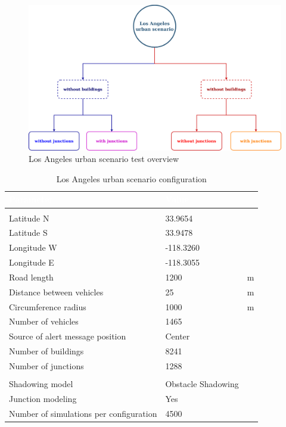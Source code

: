 		\begin{figure}[H]
			\centering
			\includegraphics[width=1.0\textwidth]{immagini/la-25/overview}
			\caption{Los Angeles urban scenario test overview}
			\label{fig:la-overview}
		\end{figure}
	
		\begin{table}[H]
			\def\arraystretch{1.1}
			\begin{tabularx}{\textwidth}{l | l  l}
				\rowcolor{I} {\large \textcolor{white}{Parameter}} & {\large \textcolor{white}{Value}} & {\large \textcolor{white}{}} \TBstrut  \\
				\toprule
				\endhead
				\rowcolor{P} \multicolumn{3}{c}{Scenario configuration} \\
				\midrule[1pt]
				Latitude N								& 33.9654				& \textdegree		\\
				Latitude S								& 33.9478				& \textdegree		\\
				Longitude W								& -118.3260				& \textdegree		\\
				Longitude E								& -118.3055				& \textdegree		\\
				Road length 							& 1200	 				& m		\\
				Distance between vehicles 				& 25					& m		\\
				Circumference radius					& 1000					& m		\\
				Number of vehicles						& 1465					& 		\\
				Source of alert message position		& Center				&		\\
				Number of buildings						& 8241					&		\\
				Number of junctions						& 1288					&		\\	
				\midrule[1pt]
				\rowcolor{P} \multicolumn{3}{c}{Simulator configuration} \\
				\midrule[1pt]
				Shadowing model							& Obstacle Shadowing 	&		\\
				Junction modeling						& Yes					&		\\
				\midrule[1pt]
				Number of simulations per configuration	& 4500					&		\\
				\bottomrule
			\end{tabularx}
			\caption{Los Angeles urban scenario configuration}
			\label{tab:la-25}
		\end{table}
	
